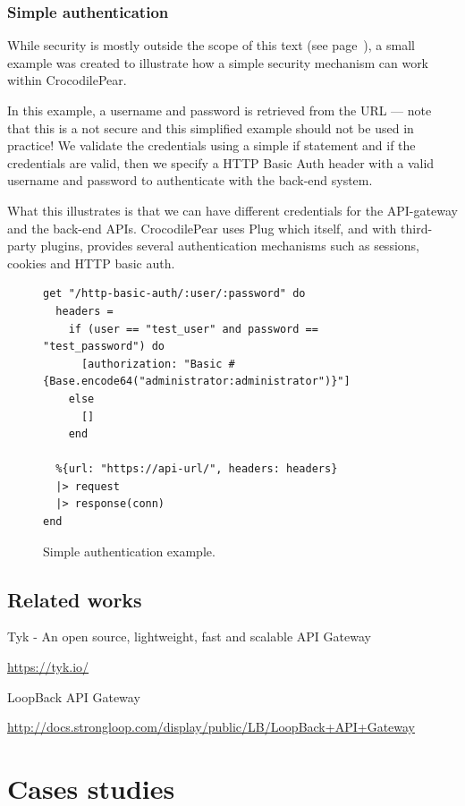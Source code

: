 \documentclass{cslthse-msc}
\begin{document}
\subsection{Simple authentication}
While security is mostly outside the scope of this text (see page~\pageref{sec:security}), a small example was created to illustrate how a simple security mechanism can work within CrocodilePear.

In this example, a username and password is retrieved from the URL --- note that this is a not secure and this simplified example should not be used in practice! We validate the credentials using a simple if statement and if the credentials are valid, then we specify a HTTP Basic Auth header with a valid username and password to authenticate with the back-end system.

What this illustrates is that we can have different credentials for the API-gateway and the back-end APIs. CrocodilePear uses Plug which itself, and with third-party plugins, provides several authentication mechanisms such as sessions, cookies and HTTP basic auth.

\begin{figure}[H]
  \centering
\begin{lstlisting}[breaklines=true,frame=single]
get "/http-basic-auth/:user/:password" do
  headers =
    if (user == "test_user" and password == "test_password") do
      [authorization: "Basic #{Base.encode64("administrator:administrator")}"]
    else
      []
    end
  
  %{url: "https://api-url/", headers: headers}
  |> request
  |> response(conn)
end
\end{lstlisting}
  \caption{Simple authentication example.}
\end{figure}

\section{Related works}
Tyk - An open source, lightweight, fast and scalable API Gateway

\noindent \url{https://tyk.io/}

\vspace{5mm}
\noindent LoopBack API Gateway

\noindent \url{http://docs.strongloop.com/display/public/LB/LoopBack+API+Gateway}


\chapter{Cases studies}
\end{document}
